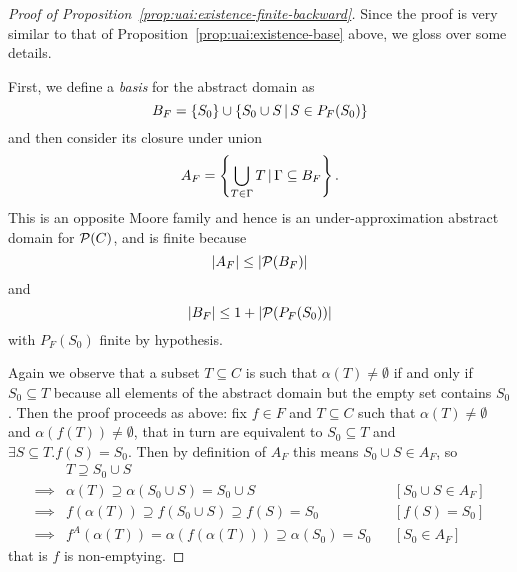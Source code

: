\begin{proof}[Proof of Proposition~\ref{prop:uai:existence-finite-backward}]
	Since the proof is very similar to that of Proposition~\ref{prop:uai:existence-base} above, we gloss over some details.

	First, we define a \textit{basis} for the abstract domain as
	\begin{equation*}
		B_F = \{ S_0 \} \cup \{ S_0 \cup S \,\vert\, S \in P_F(S_0) \}
	\end{equation*}
	and then consider its  closure under union
	\begin{equation*}
		A_F = \left\lbrace \bigcup\limits_{T \in \Gamma} T \,\vert\, \Gamma \subseteq B_F \right\rbrace .
	\end{equation*}
	This is an opposite Moore family and hence is an under-approximation abstract domain for $\mathcal{P}(C)$, and is finite because
	\begin{equation*}
		\lvert A_F\rvert \le \lvert\mathcal{P}(B_F)\rvert
	\end{equation*}
	and
	\begin{equation*}
		\lvert B_F\rvert \le 1 + \lvert\mathcal{P}(P_F(S_0))\rvert
	\end{equation*}
	with $P_F(S_0)$ finite by hypothesis.

	Again we observe that a subset $T \subseteq C$ is such that $\alpha(T) \neq \emptyset$ if and only if $S_0 \subseteq T$ because all elements of the abstract domain but the empty set contains $S_0$. Then the proof proceeds as above: fix $f \in F$ and $T \subseteq C$ such that $\alpha(T) \neq \emptyset$ and $\alpha(f(T)) \neq \emptyset$, that in turn are equivalent to $S_0 \subseteq T$ and $\exists S \subseteq T. f(S) = S_0$. Then by definition of $A_F$ this means $S_0 \cup S \in A_F$, so
	\begin{align*}
		         & T \supseteq S_0 \cup S                                              &  &                      \\
		\implies & \alpha(T) \supseteq \alpha(S_0 \cup S) = S_0 \cup S                 &  & [S_0 \cup S \in A_F] \\
		\implies & f(\alpha(T)) \supseteq f(S_0 \cup S) \supseteq f(S) = S_0           &  & [f(S) = S_0]         \\
		\implies & f^{A}(\alpha(T)) = \alpha(f(\alpha(T))) \supseteq \alpha(S_0) = S_0 &  & [S_0 \in A_F]
	\end{align*}
	that is $f$ is non-emptying.
\end{proof}

